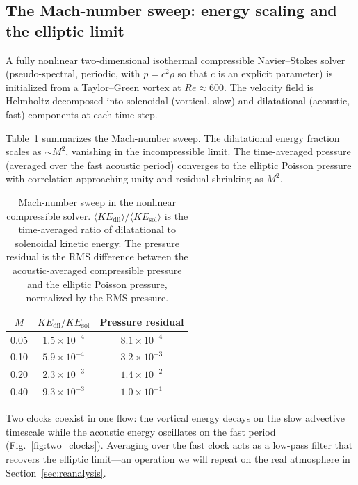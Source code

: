 \documentclass[aps,prfluids,preprint,superscriptaddress,nofootinbib]{revtex4-2}
\begin{document}
\subsection{The Mach-number sweep: energy scaling and the elliptic limit}
\label{sec:nonlinear}

A fully nonlinear two-dimensional isothermal compressible Navier--Stokes solver (pseudo-spectral, periodic, with $p = c^2\rho$ so that $c$ is an explicit parameter) is initialized from a Taylor--Green vortex at $Re \approx 600$. The velocity field is Helmholtz-decomposed into solenoidal (vortical, slow) and dilatational (acoustic, fast) components at each time step.

Table~\ref{tab:mach} summarizes the Mach-number sweep. The dilatational energy fraction scales as $\sim M^2$, vanishing in the incompressible limit. The time-averaged pressure (averaged over the fast acoustic period) converges to the elliptic Poisson pressure with correlation approaching unity and residual shrinking as $M^2$.

\begin{table}[t]
\centering
\caption{Mach-number sweep in the nonlinear compressible solver.
$\langle KE_{\mathrm{dil}}\rangle / \langle KE_{\mathrm{sol}}\rangle$ is the
time-averaged ratio of dilatational to solenoidal kinetic energy. The pressure
residual is the RMS difference between the acoustic-averaged compressible pressure
and the elliptic Poisson pressure, normalized by the RMS pressure.}
\label{tab:mach}
\begin{tabular}{ccc}
\toprule
$M$ & $KE_{\mathrm{dil}}/KE_{\mathrm{sol}}$ &
Pressure residual \\
\midrule
0.05 & $1.5\times 10^{-4}$ & $8.1\times 10^{-4}$ \\
0.10 & $5.9\times 10^{-4}$ & $3.2\times 10^{-3}$ \\
0.20 & $2.3\times 10^{-3}$ & $1.4\times 10^{-2}$ \\
0.40 & $9.3\times 10^{-3}$ & $1.0\times 10^{-1}$ \\
\bottomrule
\end{tabular}
\end{table}

Two clocks coexist in one flow: the vortical energy decays on the slow advective timescale while the acoustic energy oscillates on the fast period (Fig.~\ref{fig:two_clocks}). Averaging over the fast clock acts as a low-pass filter that recovers the elliptic limit---an operation we will repeat on the real atmosphere in Section~\ref{sec:reanalysis}.
\end{document}
